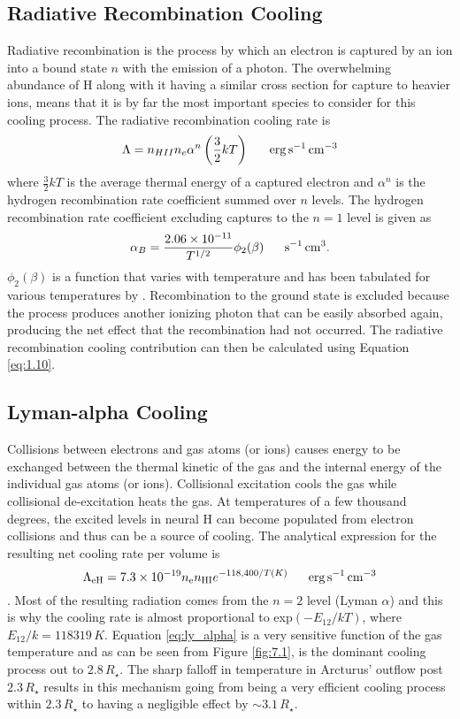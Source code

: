 \subsection{Radiative Recombination Cooling}\label{sec:3.3}
Radiative recombination is the process by which an electron is captured by an ion into a bound state $n$ with the emission of a photon. The overwhelming abundance of H along with it having a similar cross section for capture to heavier ions, means that it is by far the most important species to consider for this cooling process. The radiative recombination cooling rate is 
\begin{equation}
\Lambda = n_{HII}n_e  \alpha ^{n}\left(\frac{3}{2}kT\right) \ \ \ \ \ \rm{erg\,s^{-1}\,cm^{-3}}
\end{equation}
where $\frac{3}{2}kT$ is the average thermal energy of a captured electron and $\alpha ^{n}$ is the hydrogen recombination rate coefficient summed over $n$ levels. The hydrogen recombination rate coefficient excluding captures to the $n=1$ level is given as 
\begin{equation}
\alpha _{B}= \frac{2.06\times 10^{-11}}{T^{1/2}}\phi _{2}(\beta) \ \ \ \ \ \rm{s^{-1}\,cm^{3}}.
\end{equation}
$\phi _{2}(\beta)$ is a function that varies with temperature and has been tabulated for various temperatures by \citep{spitzer_1978}. Recombination to the ground state is excluded because the process produces another ionizing
photon that can be easily absorbed again, producing the net effect that the recombination had not occurred. The radiative recombination cooling contribution can then be calculated using Equation \ref{eq:1.10}.

\subsection{Lyman-alpha Cooling}\label{sec:3.2}
Collisions between electrons and gas atoms (or ions) causes energy to be exchanged between the thermal kinetic of the gas and the internal energy of the individual gas atoms (or ions). Collisional excitation cools the gas while collisional de-excitation heats the gas. At temperatures of a few thousand degrees, the excited levels in neural H can become populated from electron collisions and thus can be a source of cooling. The analytical expression for the resulting net cooling rate per volume is
\begin{equation}
\label{eq:ly_alpha}
\Lambda _{\rm{eH}} = 7.3\times 10^{-19}n_{\rm{e}}n_{\rm{HI}}e^{-118,400/T(K)} \ \ \ \ \ \rm{erg\,s^{-1}\,cm^{-3}}
\end{equation}
\cite{spitzer_1978}. Most of the resulting radiation comes from the $n=2$ level (Lyman $\alpha$) and this is why the cooling rate is almost proportional to exp$(-E_{12}/kT)$, where $E_{12}/k=118319\,K$. Equation \ref{eq:ly_alpha} is a very sensitive function of the gas temperature and as can be seen from Figure \ref{fig:7.1}, is the dominant cooling process out to $2.8\,R_{\star}$. The sharp falloff in temperature in Arcturus' outflow post $2.3\,R_{\star}$ results in this mechanism going from being a very efficient cooling process within $2.3\,R_{\star}$ to having a negligible effect by $\sim 3.1\,R_{\star}$.

